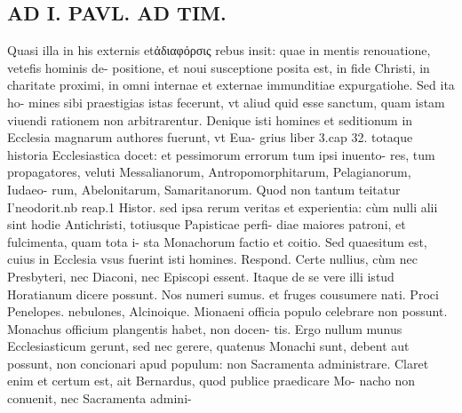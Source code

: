 \documentclass{article}
\begin{document}
\begin{pages}
\section*{AD I. PAVL. AD TIM. }
\marginpar{[ p.222 ]}\pstart Quasi illa in his externis etἀδιαφόρσις rebus insit: quae in mentis renouatione, vetefis hominis de- positione, et noui susceptione posita est, in fide Christi, in charitate proximi, in omni internae et externae immunditiae expurgatiohe. Sed ita ho- mines sibi praestigias istas fecerunt, vt aliud quid esse sanctum, quam istam viuendi rationem non arbitrarentur. Denique isti homines et seditionum in Ecclesia magnarum authores fuerunt, vt Eua- grius liber 3.cap 32. totaque historia Ecclesiastica docet: et pessimorum errorum tum ipsi inuento- res, tum propagatores, veluti Messalianorum, Antropomorphitarum, Pelagianorum, Iudaeo- rum, Abelonitarum, Samaritanorum. Quod non tantum teitatur I'neodorit.nb reap.1 Histor. sed ipsa rerum veritas et experientia: cùm nulli alii sint hodie Antichristi, totiusque Papisticae perfi- diae maiores patroni, et fulcimenta, quam tota i- sta Monachorum factio et coitio.  \pend\pstart Sed quaesitum est, cuius in Ecclesia vsus fuerint isti homines. Respond. Certe nullius, cùm nec Presbyteri, nec Diaconi, nec Episcopi essent. Itaque  de se vere illi istud Horatianum dicere possunt. Nos numeri sumus. et fruges cousumere nati. Proci Penelopes. nebulones, Alcinoique.  \pend\pstart Mionaeni officia populo celebrare non possunt. Monachus officium plangentis habet, non docen- tis. Ergo nullum munus Ecclesiasticum gerunt, sed nec gerere, quatenus Monachi sunt, debent aut possunt, non concionari apud populum: non Sacramenta administrare. Claret enim et certum est, ait Bernardus, quod publice praedicare Mo- nacho non conuenit, nec Sacramenta admini-  \pend

\end{pages}
\end{document}
